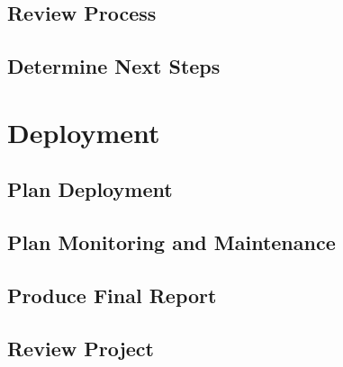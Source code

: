 \subsection{Review Process}
\subsection{Determine Next Steps}


\section{Deployment}
\subsection{Plan Deployment}
\subsection{Plan Monitoring and Maintenance}
\subsection{Produce Final Report}
\subsection{Review Project}


